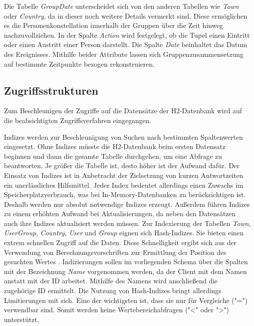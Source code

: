 Die Tabelle \textit{GroupDate} unterscheidet sich von den anderen Tabellen wie \textit{Town} oder \textit{Country}, da in dieser noch weitere Details vermerkt sind. Diese ermöglichen es die Personenkonstellation innerhalb der Gruppen über die Zeit hinweg nachzuvollziehen. In der Spalte \textit{Action} wird festgelegt, ob die Tupel einen Eintritt oder einen Austritt einer Person darstellt. Die Spalte \textit{Date} beinhaltet das Datum des Ereignisses. Mithilfe beider Attribute lassen sich Gruppenzusammensetzung auf bestimmte Zeitpunkte bezogen rekonstruieren.

\subsection{Zugriffsstrukturen}

Zum Beschleunigen der Zugriffe auf die Datensätze der H2-Datenbank wird auf die beabsichtigten Zugriffsverfahren eingegangen. 

Indizes werden zur Beschleunigung von Suchen nach bestimmten Spaltenwerten eingesetzt. Ohne Indizes müsste die H2-Datenbank beim ersten Datensatz beginnen und dann die gesamte Tabelle durchgehen, um eine Abfrage zu beantworten. Je größer die Tabelle ist, desto höher ist der Aufwand dafür. Der Einsatz von Indizes ist in Anbetracht der Zielsetzung von kurzen Antwortzeiten ein unerlässliches Hilfsmittel. Jeder Index bedeutet allerdings einen Zuwachs im Speicherplatzverbrauch, was bei In-Memory-Datenbanken zu berücksichtigen ist. Deshalb werden nur absolut notwendige Indizes erzeugt. Außerdem führen Indizes zu einem erhöhten Aufwand bei Aktualisierungen, da neben den Datensätzen auch ihre Indizes aktualisiert werden müssen. Zur Indexierung der Tabellen \textit{Town}, \textit{UserGroup}, \textit{Country}, \textit{User} und \textit{Group} eignen sich Hash-Indizes. Sie bieten einen extrem schnellen Zugriff auf die Daten. Diese Schnelligkeit ergibt sich aus der Verwendung von Berechnungsvorschriften zur Ermittlung der Position des gesuchten Wertes  \cite{SWB-352401869}. Indizierungen sollen im vorliegenden Schema über die Spalten mit der Bezeichnung \textit{Name} vorgenommen werden, da der Client mit dem Namen anstatt mit der ID arbeitet. Mithilfe des Namens wird anschließend die zugehörige ID ermittelt. Die Nutzung von Hash-Indizes bringt allerdings Limitierungen mit sich. Eine der wichtigsten ist, dass sie nur für Vergleiche ("=") verwendbar sind. Somit werden keine Wertebereichabfragen ("<" oder ">") unterstützt.

